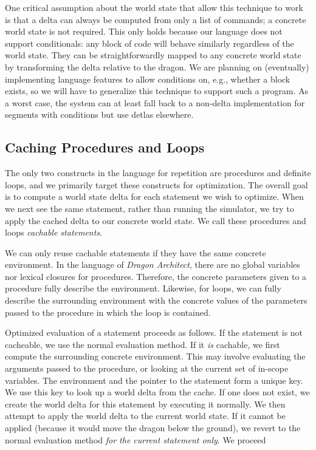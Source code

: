 \documentclass{sig-alternate}
\newcommand{\da}{\emph{Dragon Architect}}
\begin{document}
One critical assumption about the world state that allow this technique to work is that a delta can always be computed from only a list of commands; a concrete world state is not required. This only holds because our language does not support conditionals: any block of code will behave similarly regardless of the world state. They can be straightforwardly mapped to any concrete world state by transforming the delta relative to the dragon. We are planning on (eventually) implementing language features to allow conditions on, e.g., whether a block exists, so we will have to generalize this technique to support such a program. As a worst case, the system can at least fall back to a non-delta implementation for segments with conditions but use detlas elsewhere.

\subsection{Caching Procedures and Loops}

The only two constructs in the language for repetition are procedures and definite loops, and we primarily target these constructs for optimization. The overall goal is to compute a world state delta for each statement we wish to optimize. When we next see the same statement, rather than running the simulator, we try to apply the cached delta to our concrete world state. We call these procedures and loops \emph{cachable statements}.

We can only reuse cachable statements if they have the same concrete environment. In the language of \da{}, there are no global variables nor lexical closures for procedures. Therefore, the concrete parameters given to a procedure fully describe the environment. Likewise, for loops, we can fully describe the surrounding environment with the concrete values of the parameters passed to the procedure in which the loop is contained.

Optimized evaluation of a statement proceeds as follows. If the statement is not cacheable, we use the normal evaluation method. If it \emph{is} cachable, we first compute the surrounding concrete environment. This may involve evaluating the arguments passed to the procedure, or looking at the current set of in-scope variables. The environment and the pointer to the statement form a unique key. We use this key to look up a world delta from the cache. If one does not exist, we create the world delta for this statement by executing it normally. We then attempt to apply the world delta to the current world state. If it cannot be applied (because it would move the dragon below the ground), we revert to the normal evaluation method \emph{for the current statement only}. We proceed 
\end{document}

